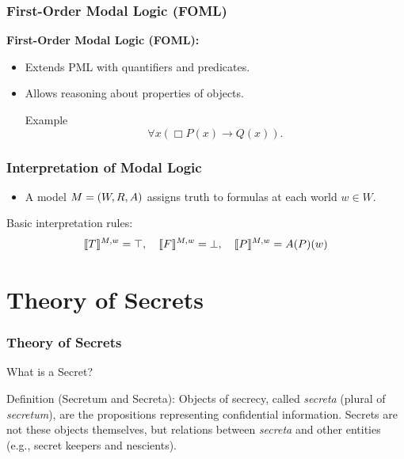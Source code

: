 \documentclass[aspectratio=169]{beamer}
\let\mathcal\relax
\begin{document}
\begin{frame}
\frametitle{First-Order Modal Logic (FOML)}
    \Large 
    \textbf{First-Order Modal Logic (FOML):}
    \begin{itemize}
        \item Extends PML with quantifiers and predicates.
        \item Allows reasoning about properties of objects.
        \begin{block}{Example}
            \[
            \forall x (\Box P(x) \rightarrow Q(x)).
            \]
        \end{block}
    \end{itemize}
\end{frame}

\begin{frame}
\frametitle{Interpretation of Modal Logic}
\Large
\begin{itemize}
    \item A model $\mathcal{M} = (W, R, A)$ assigns truth to formulas at each world $w \in W$.
\end{itemize}
\begin{block}{Basic interpretation rules:}
\[
\llbracket T \rrbracket^{\mathcal{M}, w} = \top, 
\quad 
\llbracket F \rrbracket^{\mathcal{M}, w} = \bot, 
\quad 
\llbracket P \rrbracket^{\mathcal{M}, w} = A(P)(w)
\]
\end{block}
\end{frame}


\section{Theory of Secrets}

\begin{frame}
\frametitle{Theory of Secrets}

\Large What is a Secret?

\vspace{1em}

\begin{block}{Definition (Secretum and Secreta):}  
Objects of secrecy, called \emph{secreta} (plural of \emph{secretum}), are the propositions representing confidential information.  
Secrets are not these objects themselves, but relations between \emph{secreta} and other entities (e.g., secret keepers and nescients).
\end{block}
\end{frame}
\end{document}
